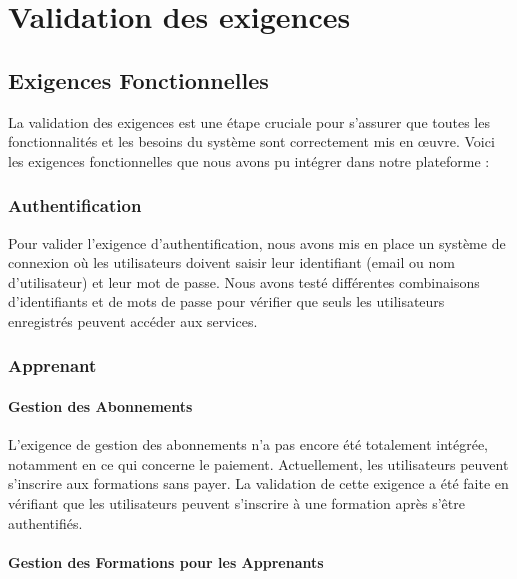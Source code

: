 \section{Validation des exigences}

\subsection{Exigences Fonctionnelles}

La validation des exigences est une étape cruciale pour s’assurer que toutes les fonctionnalités et les besoins du système sont correctement mis en œuvre. Voici les exigences fonctionnelles que nous avons pu intégrer dans notre plateforme :

\subsubsection{Authentification}

Pour valider l'exigence d'authentification, nous avons mis en place un système de connexion où les utilisateurs doivent saisir leur identifiant (email ou nom d'utilisateur) et leur mot de passe. Nous avons testé différentes combinaisons d'identifiants et de mots de passe pour vérifier que seuls les utilisateurs enregistrés peuvent accéder aux services.

\subsubsection{Apprenant}

\paragraph{Gestion des Abonnements}

L'exigence de gestion des abonnements n'a pas encore été totalement intégrée, notamment en ce qui concerne le paiement. Actuellement, les utilisateurs peuvent s'inscrire aux formations sans payer. La validation de cette exigence a été faite en vérifiant que les utilisateurs peuvent s'inscrire à une formation après s'être authentifiés.

\paragraph{Gestion des Formations pour les Apprenants}

